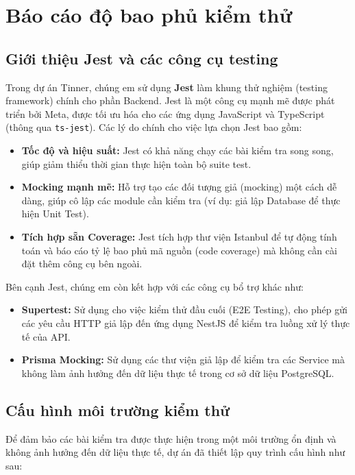 \section{Báo cáo độ bao phủ kiểm thử}
\label{sec:testing_coverage}

\subsection{Giới thiệu Jest và các công cụ testing}

Trong dự án Tinner, chúng em sử dụng \textbf{Jest} làm khung thử nghiệm (testing framework) chính cho phần Backend. Jest là một công cụ mạnh mẽ được phát triển bởi Meta, được tối ưu hóa cho các ứng dụng JavaScript và TypeScript (thông qua \texttt{ts-jest}).
Các lý do chính cho việc lựa chọn Jest bao gồm:
\begin{itemize}
    \item \textbf{Tốc độ và hiệu suất:} Jest có khả năng chạy các bài kiểm tra song song, giúp giảm thiểu thời gian thực hiện toàn bộ suite test.
    \item \textbf{Mocking mạnh mẽ:} Hỗ trợ tạo các đối tượng giả (mocking) một cách dễ dàng, giúp cô lập các module cần kiểm tra (ví dụ: giả lập Database để thực hiện Unit Test).
    \item \textbf{Tích hợp sẵn Coverage:} Jest tích hợp thư viện Istanbul để tự động tính toán và báo cáo tỷ lệ bao phủ mã nguồn (code coverage) mà không cần cài đặt thêm công cụ bên ngoài.
\end{itemize}
Bên cạnh Jest, chúng em còn kết hợp với các công cụ bổ trợ khác như:
\begin{itemize}
    \item \textbf{Supertest:} Sử dụng cho việc kiểm thử đầu cuối (E2E Testing), cho phép gửi các yêu cầu HTTP giả lập đến ứng dụng NestJS để kiểm tra luồng xử lý thực tế của API.
    \item \textbf{Prisma Mocking:} Sử dụng các thư viện giả lập để kiểm tra các Service mà không làm ảnh hưởng đến dữ liệu thực tế trong cơ sở dữ liệu PostgreSQL.
\end{itemize}


\subsection{Cấu hình môi trường kiểm thử}
Để đảm bảo các bài kiểm tra được thực hiện trong một môi trường ổn định và không ảnh hưởng đến dữ liệu thực tế, dự án đã thiết lập quy trình cấu hình như sau:

